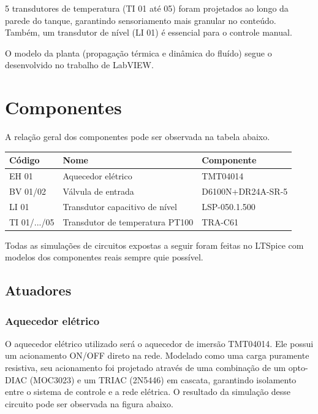 \documentclass[a4paper]{report}
\begin{document}
5 transdutores de temperatura (TI 01 até 05) foram projetados ao longo da parede do tanque, garantindo sensoriamento mais granular no conteúdo. Também, um transdutor de nível (LI 01) é essencial para o controle manual.

O modelo da planta (propagação térmica e dinâmica do fluído) segue o desenvolvido no trabalho de LabVIEW.

\section*{Componentes}

A relação geral dos componentes pode ser observada na tabela abaixo.

\begin{table}[H]
\begin{tabular}{l|l|l}
\textbf{Código} & \textbf{Nome}                   & \textbf{Componente} \\ \hline
EH 01           & Aquecedor elétrico              & TMT04014            \\ \hline
BV 01/02        & Válvula de entrada              & D6100N+DR24A-SR-5   \\ \hline
LI 01           & Transdutor capacitivo de nível  & LSP-050.1.500       \\ \hline
TI 01/.../05    & Transdutor de temperatura PT100 & TRA-C61\footnotemark \\ \hline
\end{tabular}
\end{table}


Todas as simulações de circuitos expostas a seguir foram feitas no LTSpice com modelos dos componentes reais sempre quie possível.

\subsection*{Atuadores}

\subsubsection*{Aquecedor elétrico}

O aquecedor elétrico utilizado será o aquecedor de imersão TMT04014. Ele possui um acionamento ON/OFF direto na rede. Modelado como uma carga puramente resistiva, seu acionamento foi projetado através de uma combinação de um opto-DIAC (MOC3023) e um TRIAC (2N5446) em cascata, garantindo isolamento entre o sistema de controle e a rede elétrica. O resultado da simulação desse circuito pode ser observada na figura abaixo.
\end{document}
